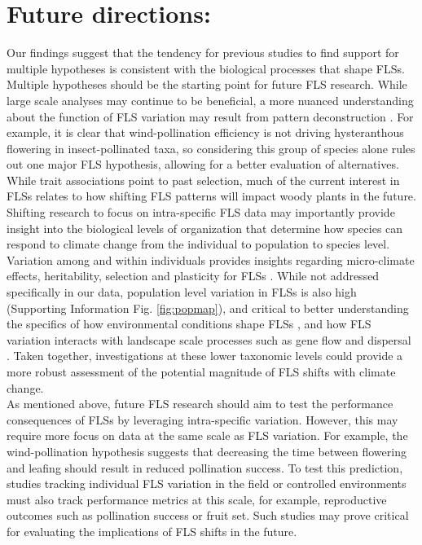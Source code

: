 \documentclass[11pt]{article}
\begin{document}
\section*{Future directions:}
\noindent Our findings suggest that the tendency for previous studies to find support for multiple hypotheses \citep{Bolmgren2003,Gougherty2018} is consistent with the biological processes that shape FLSs. Multiple hypotheses should be the starting point for future FLS research. While large scale analyses may continue to be beneficial, a more nuanced understanding about the function of FLS variation may result from pattern deconstruction \citep[i.e. grouping of species according to sub-clades or trait commonalities,][]{Terribile2009}. For example, it is clear that wind-pollination efficiency is not driving hysteranthous flowering in insect-pollinated taxa, so considering this group of species alone rules out one major FLS hypothesis, allowing for a better evaluation of alternatives.\\ 

\noindent While trait associations point to past selection, much of the current interest in FLSs relates to how shifting FLS patterns will impact woody plants in the future. Shifting research to focus on intra-specific FLS data may importantly provide insight into the biological levels of organization that determine how species can respond to climate change from the individual to population to species level. Variation among and within individuals provides insights regarding  micro-climate effects, heritability, selection and plasticity for FLSs \citep{Denechere2019}.  While not addressed specifically in our data, population level variation in FLSs is also high (Supporting Information Fig. \ref{fig:popmap}), and critical to better understanding the specifics of how environmental conditions shape FLSs \citep{Vitasse2009}, and how FLS variation interacts with landscape scale processes such as gene flow and dispersal \citep{Manel2003}. Taken together, investigations at these lower taxonomic levels could provide a more robust assessment of the potential magnitude of FLS shifts with climate change.\\

\noindent As mentioned above, future FLS research should aim to test the performance consequences of FLSs by leveraging intra-specific variation. However, this may require more focus on data at the same scale as FLS variation. For example, the wind-pollination hypothesis suggests that decreasing the time between flowering and leafing should result in reduced pollination success. To test this prediction, studies tracking individual FLS variation  in the field or controlled environments must also track performance metrics at this scale, for example, reproductive outcomes such as pollination success or fruit set. Such studies may prove critical for evaluating the implications of FLS shifts in the future. \\
\end{document}
